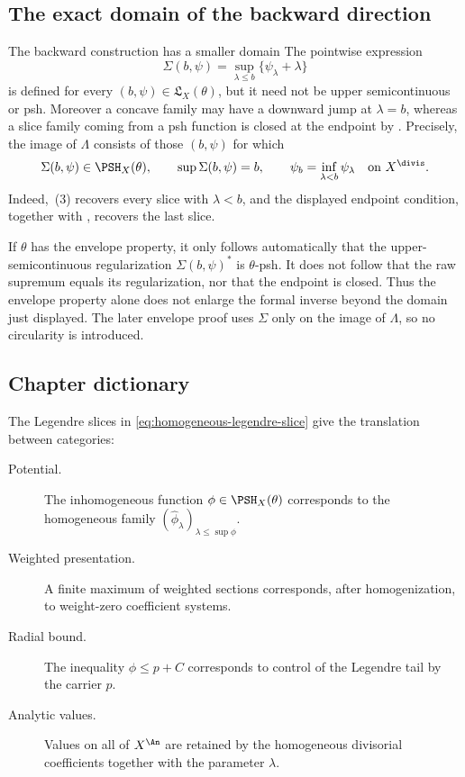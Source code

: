 \subsection{The exact domain of the backward direction}
\label{sec:ch35-domain}

\begin{warning}{The backward construction has a smaller domain}
The pointwise expression
\[
 \Sigma(b,\psi)=\sup_{\lambda\leq b}\{\psi_\lambda+\lambda\}
\]
is defined for every $(b,\psi)\in\mathfrak L_X(\theta)$, but it need not
be upper semicontinuous or psh.  Moreover a concave family may have a
downward jump at $\lambda=b$, whereas a slice family coming from a psh
function is closed at the endpoint by
.  Precisely, the image of $\Lambda$
consists of those $(b,\psi)$ for which
\[
 \Sigma(b,\psi)\in\PSH_X(\theta),\qquad
 \sup\Sigma(b,\psi)=b,\qquad
 \psi_b=\inf_{\lambda<b}\psi_\lambda
 \quad\text{on }X^{\divis}.
\]
Indeed, \,(3) recovers every slice with
$\lambda<b$, and the displayed endpoint condition, together with
, recovers the last slice.

If $\theta$ has the envelope property, it only follows automatically
that the upper-semicontinuous regularization
$\Sigma(b,\psi)^*$ is $\theta$-psh.  It does not follow that the raw
supremum equals its regularization, nor that the endpoint is closed.
Thus the envelope property alone does not enlarge the formal inverse beyond
the domain just displayed.  The later envelope proof uses $\Sigma$ only
on the image of $\Lambda$, so no circularity is introduced.
\end{warning}

\subsection{Chapter dictionary}
\label{sec:ch35-dictionary}

The Legendre slices in \eqref{eq:homogeneous-legendre-slice} give the
translation between categories:
\begin{description}
\item[Potential.]  The inhomogeneous function
  $\phi\in\PSH_X(\theta)$ corresponds to the homogeneous family
  $(\widehat\phi_\lambda)_{\lambda\leq\sup\phi}$.
\item[Weighted presentation.]  A finite maximum of weighted sections
  corresponds, after homogenization, to weight-zero coefficient systems.
\item[Radial bound.]  The inequality $\phi\leq p+C$ corresponds to control
  of the Legendre tail by the carrier $p$.
\item[Analytic values.]  Values on all of $X^{\An}$ are retained by the
  homogeneous divisorial coefficients together with the parameter $\lambda$.
\end{description}

